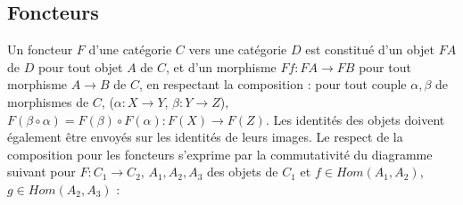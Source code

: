 \documentclass{article}
\begin{document}
\subsection{Foncteurs}

Un foncteur $F$ d'une catégorie $C$ vers une catégorie $D$ est constitué d'un objet $FA$ de $D$ pour tout objet $A$ de $C$, et d'un morphisme $Ff : FA \rightarrow FB$ pour tout morphisme $A \rightarrow B$ de $C$, en respectant la composition : pour tout couple $\alpha, \beta$ de morphismes de $C$, ($\alpha : X \rightarrow Y$, $\beta : Y \rightarrow Z$), $F( \beta \circ \alpha) = F(\beta) \circ F(\alpha) : F(X) \rightarrow F(Z) $. Les identités des objets doivent également être envoyés sur les identités de leurs images. 
Le respect de la composition pour les foncteurs s'exprime par la commutativité du diagramme suivant pour $F : C_1 \rightarrow C_2 $, $A_1,A_2,A_3$ des objets de $C_1$ et $f \in Hom(A_1,A_2)$, $g \in Hom(A_2,A_3)$ : 

\begin{center}
\end{center}
\end{document}

